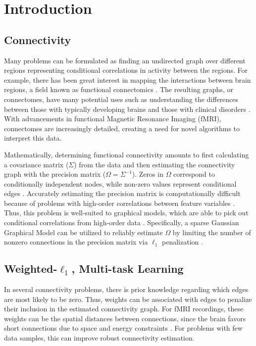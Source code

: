 \documentclass{article}
\begin{document}
\section{Introduction}
\label{sec:introduction}
\subsection{Connectivity} Many problems can be formulated as finding an undirected graph over different regions representing conditional correlations in activity between the regions. For example, there has been great interest in mapping the interactions between brain regions, a field known as functional connectomics \cite{seung2011neuroscience, smith2013functional}. The resulting graphs, or connectomes, have many potential uses such as understanding the differences between those with typically developing brains and those with clinical disorders \cite{uddin2013salience,milham2012adhd}. With advancements in functional Magnetic Resonance Imaging (fMRI), connectomes are increasingly detailed, creating a need for novel algorithms to interpret this data.

Mathematically, determining functional connectivity amounts to first calculating a covariance matrix ($\Sigma$) from the data and then estimating the connectivity graph with the precision matrix ($\Omega=\Sigma^{-1}$). Zeros in $\Omega$ correspond to conditionally independent nodes, while non-zero values represent conditional edges \cite{lauritzen1996graphical}. Accurately estimating the precision matrix is computationally difficult because of problems with high-order correlations between feature variables \cite{fan2013statistical}. Thus, this problem is well-suited to graphical models, which are able to pick out conditional correlations from high-order data \cite{koller2007graphical}. Specifically, a sparse Gaussian Graphical Model can be utilized to reliably estimate $\Omega$ by limiting the number of nonzero connections in the precision matrix via $\ell_1$ penalization \cite{friedman2008sparse,banerjee2008model}.

\subsection{Weighted-$\ell_1$, Multi-task Learning}
In several connectivity problems, there is prior knowledge regarding which edges are most likely to be zero. Thus, weights can be associated with edges to penalize their inclusion in the estimated connectivity graph. For fMRI recordings, these weights can be the spatial distances between connections, since the brain favors short connections due to space and energy constraints \cite{watts1998collective}. For problems with few data samples, this can improve robust connectivity estimation.
\end{document}
